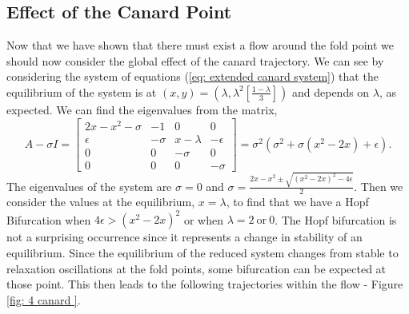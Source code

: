 \subsection{Effect of the Canard Point}\label{sec:effect-of-the-canard-point}
Now that we have shown that there must exist a flow around the fold point we should now consider the global effect of the canard trajectory. We can see by considering the  system of equations (\ref{eq: extended canard system}) that the equilibrium of the system is at $ (x,y)=(\lambda,\lambda^2[\frac{1-\lambda}{3}]) $  and depends on $\lambda$, as expected. We can find the eigenvalues from the matrix, 
\begin{equation}
A-\sigma I=\begin{bmatrix}
2x-x^2-\sigma&-1&0&0\\
\epsilon&-\sigma&x-\lambda&-\epsilon\\
0&0&-\sigma&0\\
0&0&0&-\sigma
\end{bmatrix}=\sigma^2(\sigma^2+\sigma(x^2-2x)+\epsilon).
\end{equation}
The eigenvalues of the system are $ \sigma=0 $ and $ \sigma=\frac{2x-x^2\pm\sqrt{(x^2-2x)^2-4\epsilon}}{2} $. Then we consider the values at the equilibrium, $ x=\lambda $, to find that we have a Hopf Bifurcation when $ 4\epsilon>(x^2-2x)^2 $ or when $ \lambda=2 \ \text{or} \ 0 $. The Hopf bifurcation is not a surprising occurrence since it represents a change in stability of an equilibrium. Since the equilibrium of the reduced system changes from stable to relaxation oscillations at the fold points, some bifurcation can be expected at those point.
 This then leads to the following trajectories within the flow - Figure \ref{fig: 4 canard }.

